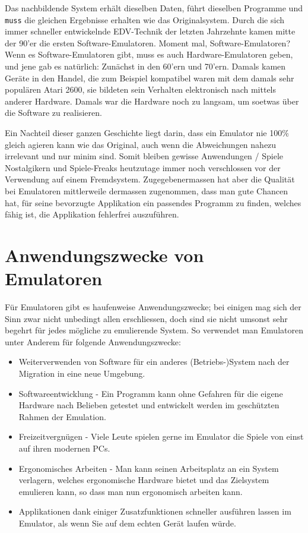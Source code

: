 \documentclass[b5paper,10pt,dvips,fleqn,titlepage,twoside]{book}
\begin{document}
Das nachbildende System erhält dieselben Daten, führt dieselben Programme und \texttt{muss} die gleichen Ergebnisse erhalten wie das Originalsystem. Durch die sich immer schneller entwickelnde EDV-Technik der letzten Jahrzehnte kamen mitte der 90'er die ersten Software-Emulatoren. Moment mal, Software-Emulatoren? Wenn es Software-Emulatoren gibt, muss es auch Hardware-Emulatoren geben, und jene gab es natürlich: Zunächst in den 60'ern und 70'ern. Damals kamen Geräte in den Handel, die zum Beispiel kompatibel waren mit dem damals sehr populären Atari 2600, sie bildeten sein Verhalten elektronisch nach mittels anderer Hardware. Damals war die Hardware noch zu langsam, um soetwas über die Software zu realisieren.

Ein Nachteil dieser ganzen Geschichte liegt darin, dass ein Emulator nie 100\% gleich agieren kann wie das Original, auch wenn die Abweichungen nahezu irrelevant und nur minim sind. Somit bleiben gewisse Anwendungen / Spiele Nostalgikern und Spiele-Freaks heutzutage immer noch verschlossen vor der Verwendung auf einem Fremdsystem. Zugegebenermassen hat aber die Qualität bei Emulatoren mittlerweile dermassen zugenommen, dass man gute Chancen hat, für seine bevorzugte Applikation ein passendes Programm zu finden, welches fähig ist, die Applikation fehlerfrei auszuführen.

\section{Anwendungszwecke von Emulatoren}
Für Emulatoren gibt es haufenweise Anwendungszwecke; bei einigen mag sich der Sinn zwar nicht unbedingt allen erschliessen, doch sind sie nicht umsonst sehr begehrt für jedes mögliche zu emulierende System.
So verwendet man Emulatoren unter Anderem für folgende Anwendungszwecke:
\newline
\begin{itemize}
\item Weiterverwenden von Software für ein anderes (Betriebs-)System nach der Migration in eine neue Umgebung.
\item Softwareentwicklung - Ein Programm kann ohne Gefahren für die eigene Hardware nach Belieben getestet und entwickelt werden im geschützten Rahmen der Emulation.
\item Freizeitvergnügen - Viele Leute spielen gerne im Emulator die Spiele von einst auf ihren modernen PCs.
\item Ergonomisches Arbeiten - Man kann seinen Arbeitsplatz an ein System verlagern, welches ergonomische Hardware bietet und das Zielsystem emulieren kann, so dass man nun ergonomisch arbeiten kann.
\item Applikationen dank einiger Zusatzfunktionen schneller ausführen lassen im Emulator, als wenn Sie auf dem echten Gerät laufen würde.
\end{itemize}
\end{document}
